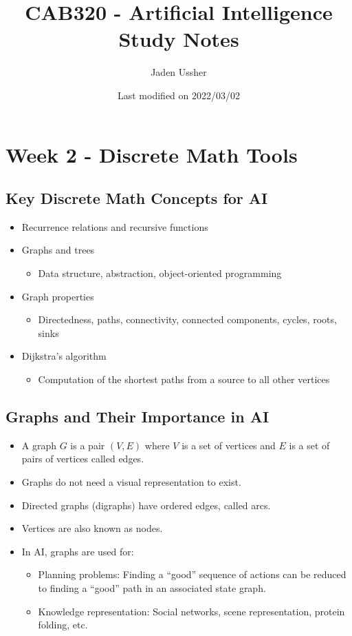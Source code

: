 \documentclass[10pt]{article}
\title{CAB320 - Artificial Intelligence Study Notes}
\author{Jaden Ussher}
\date{Last modified on 2022/03/02}
\begin{document}
\maketitle

\newpage

\tableofcontents

\newpage
\section{Week 2 - Discrete Math Tools}
\subsection{Key Discrete Math Concepts for AI}
\begin{itemize}
    \item Recurrence relations and recursive functions
    \item Graphs and trees
    \begin{itemize}
        \item Data structure, abstraction, object-oriented programming
    \end{itemize}
    \item Graph properties
    \begin{itemize}
        \item Directedness, paths, connectivity, connected components, cycles, roots, sinks
    \end{itemize}
    \item Dijkstra's algorithm
    \begin{itemize}
        \item Computation of the shortest paths from a source to all other vertices
    \end{itemize}
\end{itemize}

\subsection{Graphs and Their Importance in AI}
\begin{itemize}
    \item A graph \( G \) is a pair \( (V, E) \) where \( V \) is a set of vertices and \( E \) is a set of pairs of vertices called edges.
    \item Graphs do not need a visual representation to exist.
    \item Directed graphs (digraphs) have ordered edges, called arcs.
    \item Vertices are also known as nodes.
    \item In AI, graphs are used for:
    \begin{itemize}
        \item Planning problems: Finding a “good” sequence of actions can be reduced to finding a “good” path in an associated state graph.
        \item Knowledge representation: Social networks, scene representation, protein folding, etc.
    \end{itemize}
\end{itemize}
\end{document}
